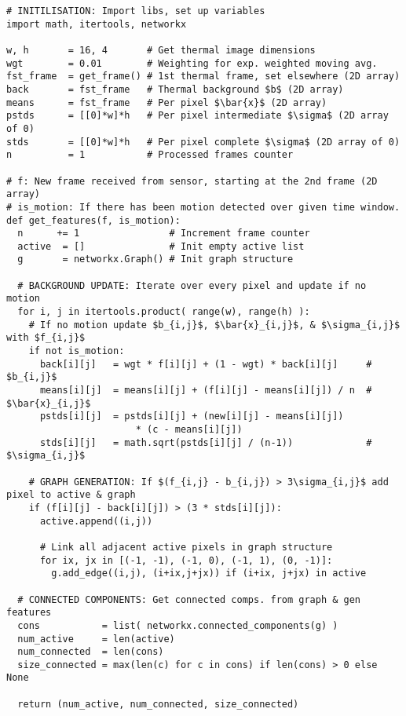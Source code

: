 \begin{verbatim}
# INITILISATION: Import libs, set up variables
import math, itertools, networkx

w, h       = 16, 4       # Get thermal image dimensions
wgt        = 0.01        # Weighting for exp. weighted moving avg.
fst_frame  = get_frame() # 1st thermal frame, set elsewhere (2D array)
back       = fst_frame   # Thermal background $b$ (2D array)
means      = fst_frame   # Per pixel $\bar{x}$ (2D array)
pstds      = [[0]*w]*h   # Per pixel intermediate $\sigma$ (2D array of 0) 
stds       = [[0]*w]*h   # Per pixel complete $\sigma$ (2D array of 0)
n          = 1           # Processed frames counter

# f: New frame received from sensor, starting at the 2nd frame (2D array)
# is_motion: If there has been motion detected over given time window.
def get_features(f, is_motion):
  n      += 1                # Increment frame counter
  active  = []               # Init empty active list
  g       = networkx.Graph() # Init graph structure

  # BACKGROUND UPDATE: Iterate over every pixel and update if no motion
  for i, j in itertools.product( range(w), range(h) ):
    # If no motion update $b_{i,j}$, $\bar{x}_{i,j}$, & $\sigma_{i,j}$  with $f_{i,j}$  
    if not is_motion:
      back[i][j]   = wgt * f[i][j] + (1 - wgt) * back[i][j]     # $b_{i,j}$
      means[i][j]  = means[i][j] + (f[i][j] - means[i][j]) / n  # $\bar{x}_{i,j}$
      pstds[i][j]  = pstds[i][j] + (new[i][j] - means[i][j])
                       * (c - means[i][j])
      stds[i][j]   = math.sqrt(pstds[i][j] / (n-1))             # $\sigma_{i,j}$
        
    # GRAPH GENERATION: If $(f_{i,j} - b_{i,j}) > 3\sigma_{i,j}$ add pixel to active & graph
    if (f[i][j] - back[i][j]) > (3 * stds[i][j]):
      active.append((i,j))

      # Link all adjacent active pixels in graph structure
      for ix, jx in [(-1, -1), (-1, 0), (-1, 1), (0, -1)]:
        g.add_edge((i,j), (i+ix,j+jx)) if (i+ix, j+jx) in active

  # CONNECTED COMPONENTS: Get connected comps. from graph & gen features
  cons           = list( networkx.connected_components(g) )
  num_active     = len(active)
  num_connected  = len(cons)
  size_connected = max(len(c) for c in cons) if len(cons) > 0 else None

  return (num_active, num_connected, size_connected)
\end{verbatim}